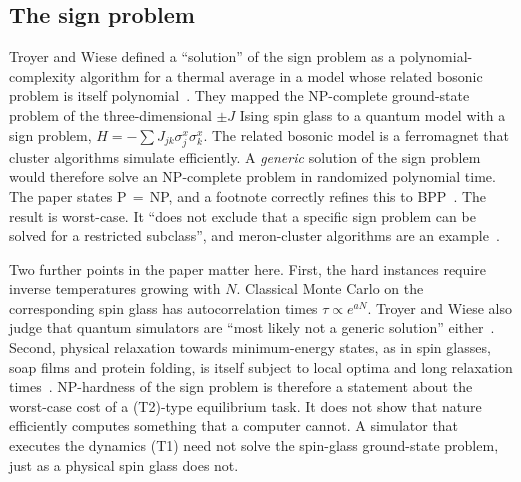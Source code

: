 \subsection{The sign problem}
\label{sec:complexity:sign}

Troyer and Wiese defined a ``solution'' of the sign problem as a
polynomial-complexity algorithm for a thermal average in a model whose related
bosonic problem is itself polynomial~\cite{Troyer2005computational}. They mapped
the NP-complete ground-state problem of the three-dimensional $\pm J$ Ising
spin glass to a quantum model with a sign problem,
$H=-\sum J_{jk}\sigma^x_j\sigma^x_k$. The related bosonic model is a
ferromagnet that cluster algorithms simulate efficiently. A \emph{generic}
solution of the sign problem would therefore solve an NP-complete problem in
randomized polynomial time. The paper states P$\,=\,$NP, and a footnote
correctly refines this to BPP~\cite{Troyer2005computational}. The result is
worst-case. It ``does not exclude that a specific sign problem can be solved
for a restricted subclass'', and meron-cluster algorithms are an
example~\cite{Troyer2005computational}.

Two further points in the paper matter here. First, the hard instances require
inverse temperatures growing with $N$. Classical Monte Carlo on the
corresponding spin glass has autocorrelation times $\tau\propto e^{aN}$.
Troyer and Wiese also judge that quantum simulators are ``most likely not a
generic solution'' either~\cite{Troyer2005computational}. Second, physical
relaxation towards minimum-energy states, as in spin glasses, soap films and
protein folding, is itself subject to local optima and long relaxation
times~\cite{Aaronson2005np}. NP-hardness of the sign problem is therefore a
statement about the worst-case cost of a (T2)-type equilibrium task. It does
not show that nature efficiently computes something that a computer cannot. A
simulator that executes the dynamics (T1) need not solve the spin-glass
ground-state problem, just as a physical spin glass does not.

